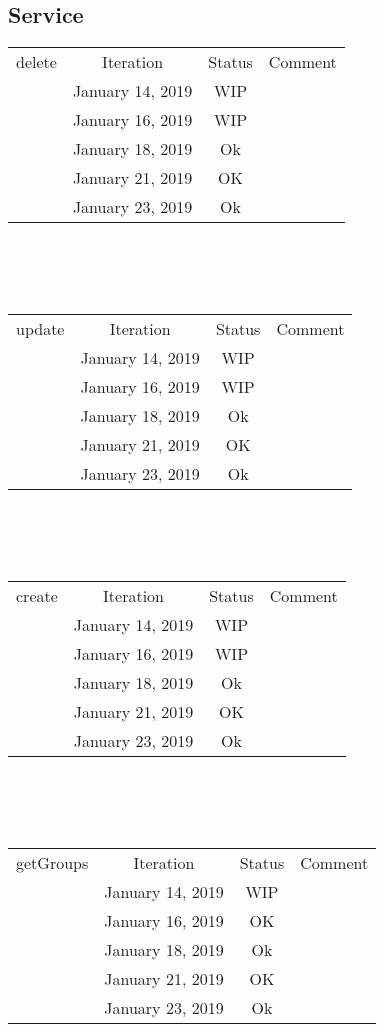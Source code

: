 \documentclass{scrreprt}
\begin{document}
\subsection{Service}
\begin{tabularx}{12cm}{X|c|c|c}
	delete & Iteration & Status & Comment \\
	& January 14, 2019 & WIP & \\
	& January 16, 2019 & WIP & \\
	& January 18, 2019 & Ok & \\	
	& January 21, 2019 & OK &  \\
	& January 23, 2019 & Ok & \\
\end{tabularx}
\\ \\ \\	
\begin{tabularx}{12cm}{X|c|c|c}
	update & Iteration & Status & Comment  \\	
	& January 14, 2019 & WIP & \\
	& January 16, 2019 & WIP & \\
	& January 18, 2019 & Ok & \\	
	& January 21, 2019 & OK & \\
	& January 23, 2019 & Ok & \\
\end{tabularx}
\\ \\ \\	
\begin{tabularx}{12cm}{X|c|c|c}
	create & Iteration & Status & Comment  \\		
	& January 14, 2019 & WIP & \\
	& January 16, 2019 & WIP & \\
	& January 18, 2019 & Ok & \\	
	& January 21, 2019 & OK &  \\
	& January 23, 2019 & Ok & \\
\end{tabularx}
\\ \\ \\
\begin{tabularx}{12cm}{X|c|c|c}
	getGroups & Iteration & Status & Comment  \\
	& January 14, 2019 & WIP & \\
	& January 16, 2019 & OK & \\
	& January 18, 2019 & Ok & \\
	& January 21, 2019 & OK &  \\
	& January 23, 2019 & Ok & \\
\end{tabularx}	
\end{document}

